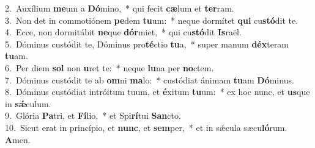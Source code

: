 {2.~}Auxílium \textbf{me}um a \textbf{Dó}mino,~* qui fecit \textbf{cæ}lum et \textbf{ter}ram.\\
{3.~}Non det in commotiónem \textbf{pe}dem \textbf{tu}um:~* neque dormítet \textbf{qui} cu\textbf{stó}dit te.\\
{4.~}Ecce, non dormitábit \textbf{ne}que \textbf{dór}miet,~* qui cu\textbf{stó}dit \textbf{Is}raël.\\
{5.~}Dóminus custódit te, Dóminus pro\textbf{té}ctio \textbf{tu}a,~* super manum \textbf{déx}teram \textbf{tu}am.\\
{6.~}Per diem \textbf{sol} non \textbf{u}ret te:~* neque \textbf{lu}na per \textbf{no}ctem.\\
{7.~}Dóminus custódit te ab \textbf{om}ni \textbf{ma}lo:~* custódiat ánimam \textbf{tu}am \textbf{Dó}minus.\\
{8.~}Dóminus custódiat intróitum tuum, et \textbf{é}xitum \textbf{tu}um:~* ex hoc nunc, et \textbf{us}que in \textbf{sǽ}culum.\\
{9.~}Glória \textbf{Pa}tri, et \textbf{Fí}lio,~* et Spi\textbf{rí}tui \textbf{San}cto.\\
{10.~}Sicut erat in princípio, et \textbf{nunc}, et \textbf{sem}per,~* et in sǽcula sæcu\textbf{ló}rum. \textbf{A}men.\\
